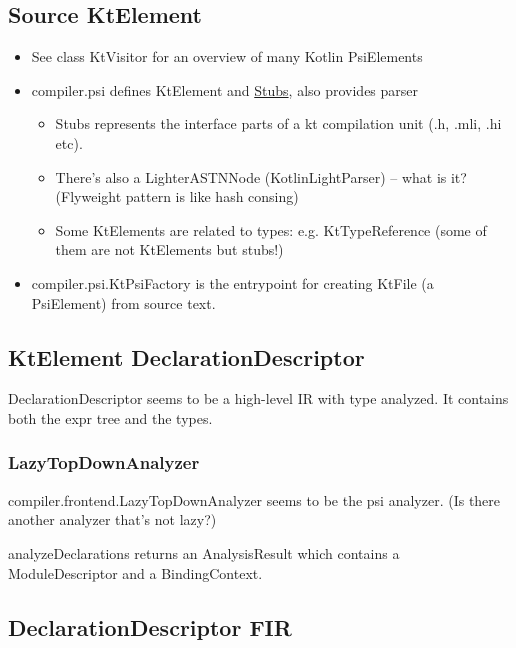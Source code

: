 \documentclass{article}
\begin{document}
\subsection{Source \textSafeTo KtElement}

\begin{itemize}
    \item See class KtVisitor for an overview of many Kotlin PsiElements
    \item compiler.psi defines KtElement and \href{https://www.jetbrains.org/intellij/sdk/docs/basics/indexing_and_psi_stubs/stub_indexes.html}{Stubs}, also provides parser
    \begin{itemize}
        \item Stubs represents the interface parts of a kt compilation unit
        (.h, .mli, .hi etc).
        \item There's also a LighterASTNNode (KotlinLightParser) -- what is it? (Flyweight pattern is like hash consing)
        \item Some KtElements are related to types: e.g. KtTypeReference (some of them are not KtElements but stubs!)
    \end{itemize}
    \item compiler.psi.KtPsiFactory is the entrypoint for creating KtFile (a PsiElement) from source text.
\end{itemize}

\subsection{KtElement \textSafeTo DeclarationDescriptor}

DeclarationDescriptor seems to be a high-level IR with type analyzed. It contains both the expr tree and the types.

\subsubsection{LazyTopDownAnalyzer}

compiler.frontend.LazyTopDownAnalyzer seems to be the psi analyzer. (Is there another analyzer that's not lazy?)

analyzeDeclarations returns an AnalysisResult which contains a ModuleDescriptor and a BindingContext.

\subsection{DeclarationDescriptor \textSafeTo FIR}
\end{document}
